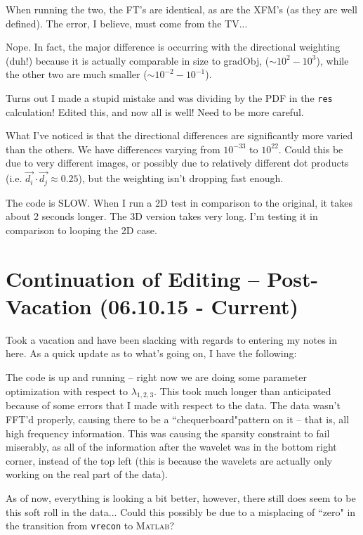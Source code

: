 \documentclass[11 pt]{article}
\let\oldsection\section
\renewcommand\section{\clearpage\newpage\oldsection}
\begin{document}
    When running the two, the FT's are identical, as are the XFM's (as they are well defined). The error, I believe, must come from the TV... 

    Nope. In fact, the major difference is occurring with the directional weighting (duh!) because it is actually comparable in size to gradObj, ($\sim 10^2 - 10^3$), while the other two are much smaller ($\sim 10^{-2} - 10^{-1}$).

    Turns out I made a stupid mistake and was dividing by the PDF in the \texttt{res} calculation! Edited this, and now all is well! Need to be more careful.

    What I've noticed is that the directional differences are significantly more varied than the others. We have differences varying from $10^{-33}$ to $10^{22}$. Could this be due to very different images, or possibly due to relatively different dot products (i.e. $\vec{d_i}\cdot\vec{d_j} \approx 0.25$), but the weighting isn't dropping fast enough. 

    The code is SLOW. When I run a 2D test in comparison to the original, it takes about 2 seconds longer. The 3D version takes very long. I'm testing it in comparison to looping the 2D case. 

\section{Continuation of Editing -- Post-Vacation (06.10.15 - Current)}
  
  Took a vacation and have been slacking with regards to entering my notes in here. As a quick update as to what's going on, I have the following:

  The code is up and running -- right now we are doing some parameter optimization with respect to $\lambda_{1,2,3}$. This took much longer than anticipated because of some errors that I made with respect to the data. The data wasn't FFT'd properly, causing there to be a ``chequerboard"pattern on it -- that is, all high frequency information. This was causing the sparsity constraint to fail miserably, as all of the information after the wavelet was in the bottom right corner, instead of the top left (this is because the wavelets are actually only working on the real part of the data). 

  As of now, everything is looking a bit better, however, there still does seem to be this soft roll in the data... Could this possibly be due to a misplacing of ``zero" in the transition from \texttt{vrecon} to \textsc{Matlab}?
\end{document}
